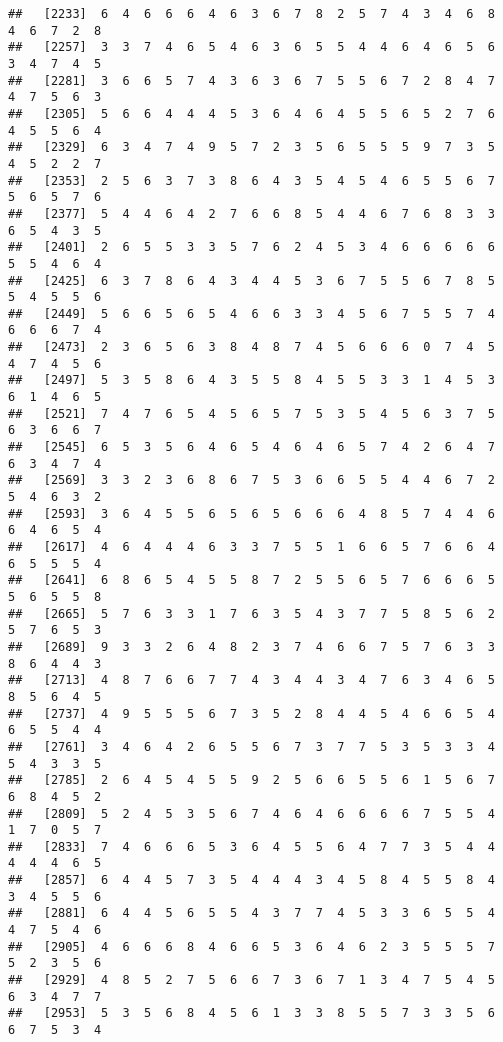 \documentclass[
]{book}
\begin{document}
\begin{verbatim}
##   [2233]  6  4  6  6  6  4  6  3  6  7  8  2  5  7  4  3  4  6  8  4  6  7  2  8
##   [2257]  3  3  7  4  6  5  4  6  3  6  5  5  4  4  6  4  6  5  6  3  4  7  4  5
##   [2281]  3  6  6  5  7  4  3  6  3  6  7  5  5  6  7  2  8  4  7  4  7  5  6  3
##   [2305]  5  6  6  4  4  4  5  3  6  4  6  4  5  5  6  5  2  7  6  4  5  5  6  4
##   [2329]  6  3  4  7  4  9  5  7  2  3  5  6  5  5  5  9  7  3  5  4  5  2  2  7
##   [2353]  2  5  6  3  7  3  8  6  4  3  5  4  5  4  6  5  5  6  7  5  6  5  7  6
##   [2377]  5  4  4  6  4  2  7  6  6  8  5  4  4  6  7  6  8  3  3  6  5  4  3  5
##   [2401]  2  6  5  5  3  3  5  7  6  2  4  5  3  4  6  6  6  6  6  5  5  4  6  4
##   [2425]  6  3  7  8  6  4  3  4  4  5  3  6  7  5  5  6  7  8  5  5  4  5  5  6
##   [2449]  5  6  6  5  6  5  4  6  6  3  3  4  5  6  7  5  5  7  4  6  6  6  7  4
##   [2473]  2  3  6  5  6  3  8  4  8  7  4  5  6  6  6  0  7  4  5  4  7  4  5  6
##   [2497]  5  3  5  8  6  4  3  5  5  8  4  5  5  3  3  1  4  5  3  6  1  4  6  5
##   [2521]  7  4  7  6  5  4  5  6  5  7  5  3  5  4  5  6  3  7  5  6  3  6  6  7
##   [2545]  6  5  3  5  6  4  6  5  4  6  4  6  5  7  4  2  6  4  7  6  3  4  7  4
##   [2569]  3  3  2  3  6  8  6  7  5  3  6  6  5  5  4  4  6  7  2  5  4  6  3  2
##   [2593]  3  6  4  5  5  6  5  6  5  6  6  6  4  8  5  7  4  4  6  6  4  6  5  4
##   [2617]  4  6  4  4  4  6  3  3  7  5  5  1  6  6  5  7  6  6  4  6  5  5  5  4
##   [2641]  6  8  6  5  4  5  5  8  7  2  5  5  6  5  7  6  6  6  5  5  6  5  5  8
##   [2665]  5  7  6  3  3  1  7  6  3  5  4  3  7  7  5  8  5  6  2  5  7  6  5  3
##   [2689]  9  3  3  2  6  4  8  2  3  7  4  6  6  7  5  7  6  3  3  8  6  4  4  3
##   [2713]  4  8  7  6  6  7  7  4  3  4  4  3  4  7  6  3  4  6  5  8  5  6  4  5
##   [2737]  4  9  5  5  5  6  7  3  5  2  8  4  4  5  4  6  6  5  4  6  5  5  4  4
##   [2761]  3  4  6  4  2  6  5  5  6  7  3  7  7  5  3  5  3  3  4  5  4  3  3  5
##   [2785]  2  6  4  5  4  5  5  9  2  5  6  6  5  5  6  1  5  6  7  6  8  4  5  2
##   [2809]  5  2  4  5  3  5  6  7  4  6  4  6  6  6  6  7  5  5  4  1  7  0  5  7
##   [2833]  7  4  6  6  6  5  3  6  4  5  5  6  4  7  7  3  5  4  4  4  4  4  6  5
##   [2857]  6  4  4  5  7  3  5  4  4  4  3  4  5  8  4  5  5  8  4  3  4  5  5  6
##   [2881]  6  4  4  5  6  5  5  4  3  7  7  4  5  3  3  6  5  5  4  4  7  5  4  6
##   [2905]  4  6  6  6  8  4  6  6  5  3  6  4  6  2  3  5  5  5  7  5  2  3  5  6
##   [2929]  4  8  5  2  7  5  6  6  7  3  6  7  1  3  4  7  5  4  5  6  3  4  7  7
##   [2953]  5  3  5  6  8  4  5  6  1  3  3  8  5  5  7  3  3  5  6  6  7  5  3  4

\end{verbatim}
\end{document}
